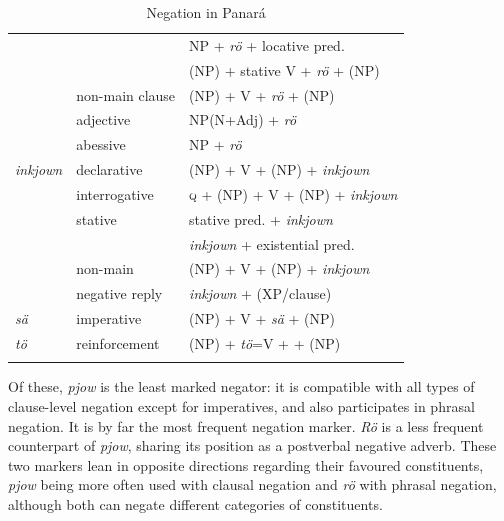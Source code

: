 \documentclass[output=paper,colorlinks,citecolor=brown,draft]{langscibook}
\begin{document}
\begin{table}
\begin{tabular}{lll}
                        &                           & NP + \textit{rö} + locative pred.  \\
                        &                           & (NP) + stative V + \textit{rö} + (NP) \\
                        & non-main clause           & (NP) + V + \textit{rö} + (NP)                \\
                        & adjective                 & NP(N+Adj) + \textit{rö} \\
                        & abessive                  & NP + \textit{rö} \medskip\\
    \hline
    \textit{inkjown}    & declarative               & (NP) + V  + (NP) + \textit{inkjown} \\
                        & interrogative             & \textsc{q} + (NP) + V + (NP) + \textit{inkjown} \\
                        & stative                   & stative pred. + \textit{inkjown} \\
                        &                           & \textit{inkjown} + existential pred. \\
                        & non-main                  & (NP) + V  + (NP) + \textit{inkjown}   \\       
                        &  negative reply           & \textit{inkjown} + (XP/clause) \medskip\\    
    \hline
    \textit{sä}         & imperative                & (NP) + V + \textit{sä} + (NP)                 \medskip\\
   
      
    
    
\midrule
     \textit{tö}        & reinforcement             & (NP) + \textit{tö}=V + \Neg{} + (NP)  \\
\lspbottomrule
  \end{tabular}
  \caption{Negation in Panará}\label{pan:pnr-table}
\end{table}


Of these, \textit{pjow} is the least marked negator: it is compatible with all types of clause-level negation except for imperatives, and also participates in phrasal negation. It is by far the most frequent negation marker. \textit{Rö} is a less frequent counterpart of \textit{pjow}, sharing its position as a postverbal negative adverb. These two markers lean in opposite directions regarding their favoured constituents, \textit{pjow} being more often used with clausal negation and \textit{rö} with phrasal negation, although both can negate different categories of constituents.
\end{document}
